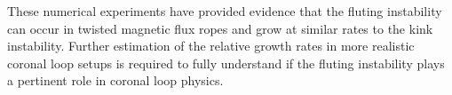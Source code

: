 \documentclass[12pt]{article}
\begin{document}
These numerical experiments have provided evidence that the fluting instability can occur in twisted magnetic flux ropes and grow at similar rates to the kink instability. Further estimation of the relative growth rates in more realistic coronal loop setups is required to fully understand if the fluting instability plays a pertinent role in coronal loop physics.

\printbibliography
\end{document}
